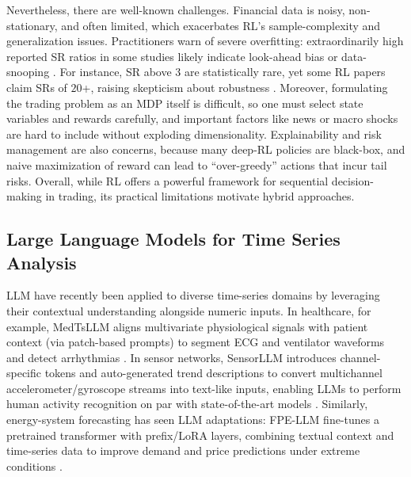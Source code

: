 Nevertheless, there are well-known challenges. Financial data is noisy, non-stationary, and often limited, which exacerbates \gls{RL}'s sample-complexity and generalization issues. Practitioners warn of severe overfitting: extraordinarily high reported \gls{SR} ratios in some studies likely indicate look-ahead bias or data-snooping \cite{Nikolaos2025}. For instance, \gls{SR} above \(3\) are statistically rare, yet some \gls{RL} papers claim \gls{SR}s of \(20\)+, raising skepticism about robustness \cite{Nikolaos2025}. Moreover, formulating the trading problem as an \gls{MDP} itself is difficult, so one must select state variables and rewards carefully, and important factors like news or macro shocks are hard to include without exploding dimensionality. Explainability and risk management are also concerns, because many deep-\gls{RL} policies are black-box, and naive maximization of reward can lead to “over-greedy” actions that incur tail risks. Overall, while \gls{RL} offers a powerful framework for sequential decision-making in trading, its practical limitations motivate hybrid approaches.

\subsection{Large Language Models for Time Series Analysis}
\gls{LLM} have recently been applied to diverse time-series domains by leveraging their contextual understanding alongside numeric inputs. In healthcare, for example, MedTsLLM aligns multivariate physiological signals with patient context (via patch-based prompts) to segment ECG and ventilator waveforms and detect arrhythmias \cite{Chan2024}. In sensor networks, SensorLLM introduces channel-specific tokens and auto-generated trend descriptions to convert multichannel accelerometer/gyroscope streams into text-like inputs, enabling \gls{LLM}s to perform human activity recognition on par with state-of-the-art models \cite{Li2025}. Similarly, energy-system forecasting has seen \gls{LLM} adaptations: FPE-LLM fine-tunes a pretrained transformer with prefix/LoRA layers, combining textual context and time-series data to improve demand and price predictions under extreme conditions \cite{Qiu2024}.

